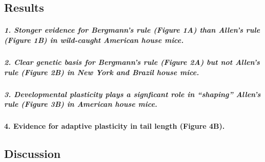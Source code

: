 \documentclass[]{article}
\let\oldparagraph\paragraph
\renewcommand{\paragraph}[1]{\oldparagraph{#1}\mbox{}}
\let\oldsubparagraph\subparagraph
\renewcommand{\subparagraph}[1]{\oldsubparagraph{#1}\mbox{}}
\begin{document}
\hypertarget{results}{%
\subsection{Results}\label{results}}

\hypertarget{stonger-evidence-for-bergmanns-rule-figure-1a-than-allens-rule-figure-1b-in-wild-caught-american-house-mice.}{%
\subparagraph{\texorpdfstring{\textbf{1. Stonger evidence for Bergmann's
rule (Figure 1A) than Allen's rule (Figure 1B) in wild-caught American
house
mice.}}{1. Stonger evidence for Bergmann's rule (Figure 1A) than Allen's rule (Figure 1B) in wild-caught American house mice.}}\label{stonger-evidence-for-bergmanns-rule-figure-1a-than-allens-rule-figure-1b-in-wild-caught-american-house-mice.}}

\hypertarget{clear-genetic-basis-for-bergmanns-rule-figure-2a-but-not-allens-rule-figure-2b-in-new-york-and-brazil-house-mice.}{%
\subparagraph{\texorpdfstring{\textbf{2. Clear genetic basis for
Bergmann's rule (Figure 2A) but not Allen's rule (Figure 2B) in New York
and Brazil house
mice.}}{2. Clear genetic basis for Bergmann's rule (Figure 2A) but not Allen's rule (Figure 2B) in New York and Brazil house mice.}}\label{clear-genetic-basis-for-bergmanns-rule-figure-2a-but-not-allens-rule-figure-2b-in-new-york-and-brazil-house-mice.}}

\hypertarget{developmental-plasticity-plays-a-signficant-role-in-shaping-allens-rule-figure-3b-in-american-house-mice.}{%
\subparagraph{\texorpdfstring{\textbf{3. Developmental plasticity plays
a signficant role in ``shaping'' Allen's rule (Figure 3B) in American
house
mice.}}{3. Developmental plasticity plays a signficant role in ``shaping'' Allen's rule (Figure 3B) in American house mice.}}\label{developmental-plasticity-plays-a-signficant-role-in-shaping-allens-rule-figure-3b-in-american-house-mice.}}

\hypertarget{evidence-for-adaptive-plasticity-in-tail-length-figure-4b.}{%
\paragraph{\texorpdfstring{\textbf{4. Evidence for adaptive plasticity
in tail length (Figure
4B).}}{4. Evidence for adaptive plasticity in tail length (Figure 4B).}}\label{evidence-for-adaptive-plasticity-in-tail-length-figure-4b.}}

\newpage

\hypertarget{discussion}{%
\subsection{Discussion}\label{discussion}}
\end{document}
